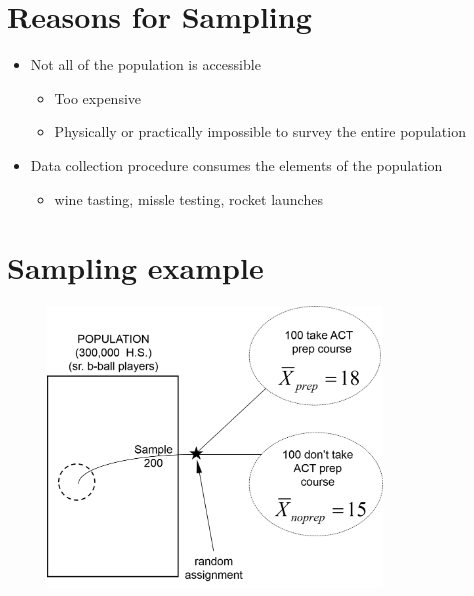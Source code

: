 \documentclass[12pt]{article}
\begin{document}
\section{Reasons for Sampling}\label{reasons-for-sampling}

\begin{itemize}
\itemsep1pt\parskip0pt
\item
  Not all of the population is accessible

  \begin{itemize}
  \itemsep1pt\parskip0pt
  \item
    Too expensive
  \item
    Physically or practically impossible to survey the entire population
  \end{itemize}
\item
  Data collection procedure consumes the elements of the population

  \begin{itemize}
  \itemsep1pt\parskip0pt
  \item
    wine tasting, missle testing, rocket launches
  \end{itemize}
\end{itemize}

\section{Sampling example}\label{sampling-example}

\begin{figure}[H]
\centering
\includegraphics[width=3.5in]{sample_examp.png}
\caption{}
\end{figure}
\end{document}
